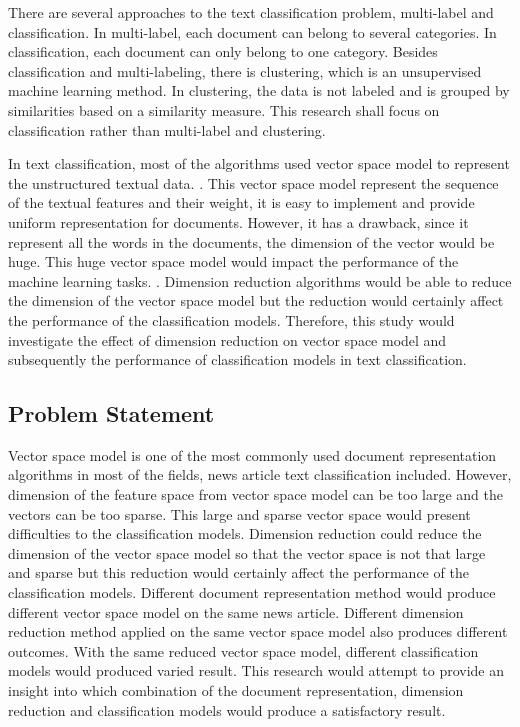 There are several approaches to the text classification problem, multi-label and classification. In multi-label, each document can belong to several categories. In classification, each document can only belong to one category. Besides classification and multi-labeling, there is clustering, which is an unsupervised machine learning method. In clustering, the data is not labeled and is grouped by similarities based on a similarity measure. This research shall focus on classification rather than multi-label and clustering.

In text classification, most of the algorithms used vector space model to represent the unstructured textual data. \cite{vectorSpaceModelText}. This vector space model represent the sequence of the textual features and their weight, it is easy to implement and provide uniform representation for documents. However, it has a drawback, since it represent all the words in the documents, the dimension of the vector would be huge. This huge vector space model would impact the performance of the machine learning tasks. \cite{knnVectorSpaceReduction}. Dimension reduction algorithms would be able to reduce the dimension of the vector space model but the reduction would certainly affect the performance of the classification models. Therefore, this study would investigate the effect of dimension reduction on vector space model and subsequently the performance of classification models in text classification.\\


\subsection{Problem Statement}
Vector space model is one of the most commonly used document representation algorithms in most of the fields, news article text classification included. However, dimension of the feature space from vector space model can be too large and the vectors can be too sparse. This large and sparse vector space would present difficulties to the classification models. Dimension reduction could reduce the dimension of the vector space model so that the vector space is not that large and sparse but this reduction would certainly affect the performance of the classification models. Different document representation method would produce different vector space model on the same news article. Different dimension reduction method applied on the same vector space model also produces different outcomes. With the same reduced vector space model, different classification models would produced varied result. This research would attempt to provide an insight into which combination of the document representation, dimension reduction and classification models would produce a satisfactory result.\\

